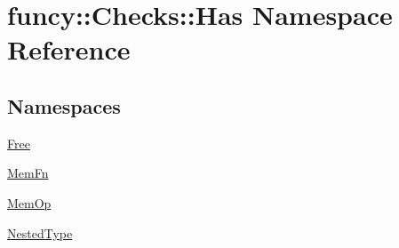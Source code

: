 \hypertarget{namespacefuncy_1_1Checks_1_1Has}{\section{funcy\-:\-:Checks\-:\-:Has Namespace Reference}
\label{namespacefuncy_1_1Checks_1_1Has}
}
\subsection*{Namespaces}
\begin{DoxyCompactItemize}
\item 
\hyperlink{namespacefuncy_1_1Checks_1_1Has_1_1Free}{Free}
\item 
\hyperlink{namespacefuncy_1_1Checks_1_1Has_1_1MemFn}{Mem\-Fn}
\item 
\hyperlink{namespacefuncy_1_1Checks_1_1Has_1_1MemOp}{Mem\-Op}
\item 
\hyperlink{namespacefuncy_1_1Checks_1_1Has_1_1NestedType}{Nested\-Type}
\end{DoxyCompactItemize}
